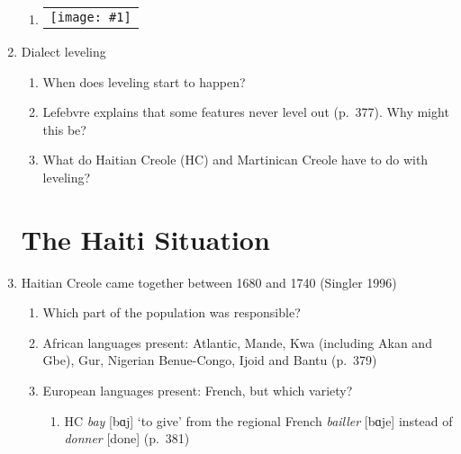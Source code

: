 \documentclass{article}
\newcommand{\lexi}[1]{\textit{#1}}
\newcommand{\image}[1]{
    \begin{tabular}[t]{c}
      \\
      \texttt{[image: \#1]}
    \end{tabular}
  }
\begin{document}
\begin{enumerate}
\begin{enumerate}
        \item \image{sub_variation.jpg}
      \end{enumerate}
      \item Dialect leveling
      \begin{enumerate}
        \item When does leveling start to happen? %
        \item Lefebvre explains that some features never level out (p.~377). Why might this be?
        \item What do Haitian Creole (HC) and Martinican Creole have to do with leveling? %
      \end{enumerate}
    \section{The Haiti Situation}
      \item Haitian Creole came together between 1680 and 1740 (Singler 1996)
      \begin{enumerate}
        \item Which part of the population was responsible? %
        \item African languages present: Atlantic, Mande, Kwa (including Akan and Gbe), Gur, Nigerian Benue-Congo, Ijoid and Bantu (p.~379)
        \item European languages present: French, but which variety? %
        \begin{enumerate}
          \item HC \lexi{bay} [bɑj] `to give' from the regional French \lexi{bailler} [bɑje] instead of \lexi{donner} [done] (p.~381)
        \end{enumerate}
      \end{enumerate}

\end{enumerate}
\end{document}
